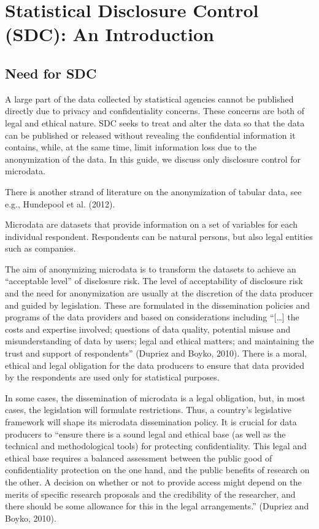 \documentclass[letterpaper,10pt,english]{sphinxmanual}
\begin{document}
\chapter{Statistical Disclosure Control (SDC): An Introduction}
\label{\detokenize{SDC_intro:statistical-disclosure-control-sdc-an-introduction}}\label{\detokenize{SDC_intro::doc}}

\section{Need for SDC}
\label{\detokenize{SDC_intro:need-for-sdc}}
A large part of the data collected by statistical agencies cannot be
published directly due to privacy and confidentiality concerns. These
concerns are both of legal and ethical nature. SDC seeks to treat and
alter the data so that the data can be published or released without
revealing the confidential information it contains, while, at the same
time, limit information loss due to the anonymization of the data. In
this guide, we discuss only disclosure control for
microdata. %
\begin{footnote}[1]\sphinxAtStartFootnote
There is another strand of literature on the anonymization of tabular
data, see e.g., Hundepool et al. (2012).
%
\end{footnote} Microdata are datasets that provide
information on a set of variables for each individual respondent.
Respondents can be natural persons, but also legal entities such as
companies.

The aim of anonymizing microdata is to transform the datasets to achieve
an “acceptable level” of disclosure risk. The level of acceptability of
disclosure risk and the need for anonymization are usually at the
discretion of the data producer and guided by legislation. These are
formulated in the dissemination policies and programs of the data
providers and based on considerations including “{[}…{]} the costs and
expertise involved; questions of data quality, potential misuse and
misunderstanding of data by users; legal and ethical matters; and
maintaining the trust and support of respondents” (Dupriez and Boyko,
2010). There is a moral, ethical and legal obligation for the data
producers to ensure that data provided by the respondents are used only
for statistical purposes.

In some cases, the dissemination of microdata is a legal obligation,
but, in most cases, the legislation will formulate restrictions. Thus, a
country’s legislative framework will shape its microdata dissemination
policy. It is crucial for data producers to “ensure there is a sound
legal and ethical base (as well as the technical and methodological
tools) for protecting confidentiality. This legal and ethical base
requires a balanced assessment between the public good of
confidentiality protection on the one hand, and the public benefits of
research on the other. A decision on whether or not to provide access
might depend on the merits of specific research proposals and the
credibility of the researcher, and there should be some allowance for
this in the legal arrangements.” (Dupriez and Boyko, 2010).
\end{document}
